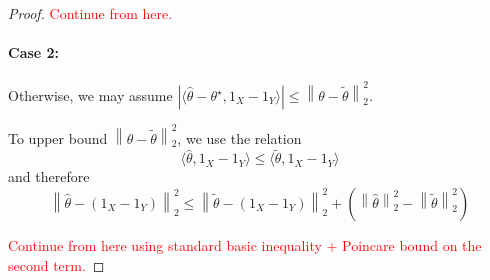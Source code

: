 \documentclass{article}
\newcommand{\norm}[1]{\left\lVert#1\right\rVert}
\newcommand{\abs}[1]{\left \lvert #1 \right \rvert}
\newcommand{\dotp}[2]{\langle #1, #2 \rangle}
\newcommand{\1}{\mathbb{I}}
\theoremstyle{alden}
\theoremstyle{aldenthm}
\theoremstyle{definition}
\theoremstyle{remark}
\begin{document}
\begin{proof}
	\textcolor{red}{Continue from here.}


	\paragraph{Case 2:} Otherwise, we may assume $\abs{\dotp{\widehat{\theta} - \theta^{\star}}{1_X - 1_Y}} \leq \norm{\theta - \widetilde{\theta}}_2^2$.
	
	To upper bound $\norm{\theta - \widetilde{\theta}}_2^2$, we use the relation
	\begin{equation*}
	\dotp{\widehat{\theta}}{1_X - 1_Y} \leq  \dotp{\widetilde{\theta}}{1_X - 1_Y}
	\end{equation*}
	and therefore
	\begin{equation*}
	\norm{\widehat{\theta} - (1_X - 1_Y)}_2^2 \leq \norm{\widetilde{\theta} - (1_X - 1_Y)}_2^2 + \left(\norm{\widehat{\theta}}_2^2 - \norm{\widetilde{\theta}}_2^2\right)
	\end{equation*}
	
	\textcolor{red}{Continue from here using standard basic inequality + Poincare bound on the second term.}
	
	
\end{proof}

\clearpage



\end{document}
